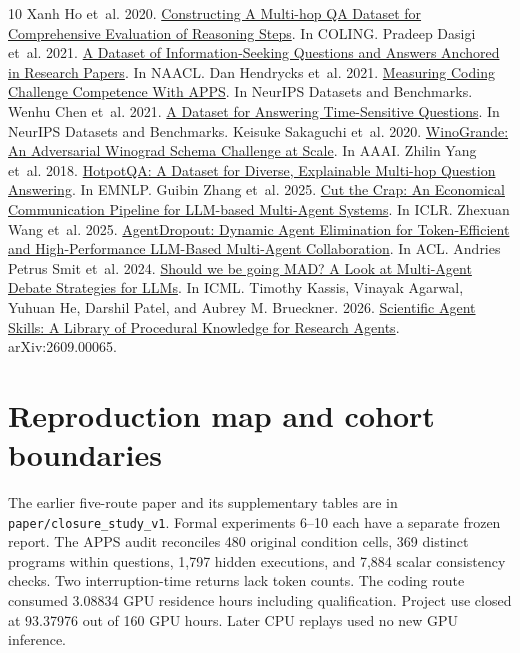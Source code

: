 \documentclass[11pt]{article}
\begin{document}
\begin{thebibliography}{10}
 Xanh Ho et~al. 2020. \href{https://aclanthology.org/2020.coling-main.580/}{Constructing A Multi-hop QA Dataset for Comprehensive Evaluation of Reasoning Steps}. In COLING.
 Pradeep Dasigi et~al. 2021. \href{https://aclanthology.org/2021.naacl-main.365/}{A Dataset of Information-Seeking Questions and Answers Anchored in Research Papers}. In NAACL.
 Dan Hendrycks et~al. 2021. \href{https://arxiv.org/abs/2105.09938}{Measuring Coding Challenge Competence With APPS}. In NeurIPS Datasets and Benchmarks.
 Wenhu Chen et~al. 2021. \href{https://arxiv.org/abs/2108.06314}{A Dataset for Answering Time-Sensitive Questions}. In NeurIPS Datasets and Benchmarks.
 Keisuke Sakaguchi et~al. 2020. \href{https://arxiv.org/abs/1907.10641}{WinoGrande: An Adversarial Winograd Schema Challenge at Scale}. In AAAI.
 Zhilin Yang et~al. 2018. \href{https://aclanthology.org/D18-1259/}{HotpotQA: A Dataset for Diverse, Explainable Multi-hop Question Answering}. In EMNLP.
 Guibin Zhang et~al. 2025. \href{https://arxiv.org/abs/2410.02506}{Cut the Crap: An Economical Communication Pipeline for LLM-based Multi-Agent Systems}. In ICLR.
 Zhexuan Wang et~al. 2025. \href{https://aclanthology.org/2025.acl-long.1170/}{AgentDropout: Dynamic Agent Elimination for Token-Efficient and High-Performance LLM-Based Multi-Agent Collaboration}. In ACL.
 Andries Petrus Smit et~al. 2024. \href{https://proceedings.mlr.press/v235/smit24a.html}{Should we be going MAD? A Look at Multi-Agent Debate Strategies for LLMs}. In ICML.
 Timothy Kassis, Vinayak Agarwal, Yuhuan He, Darshil Patel, and Aubrey M. Brueckner. 2026. \href{https://arxiv.org/abs/2609.00065}{Scientific Agent Skills: A Library of Procedural Knowledge for Research Agents}. arXiv:2609.00065.
\end{thebibliography}
\appendix
\section{Reproduction map and cohort boundaries}
The earlier five-route paper and its supplementary tables are in \texttt{paper/closure\_study\_v1}. Formal experiments 6--10 each have a separate frozen report. The APPS audit reconciles 480 original condition cells, 369 distinct programs within questions, 1,797 hidden executions, and 7,884 scalar consistency checks. Two interruption-time returns lack token counts. The coding route consumed 3.08834 GPU residence hours including qualification. Project use closed at 93.37976 out of 160 GPU hours. Later CPU replays used no new GPU inference.
\end{document}
